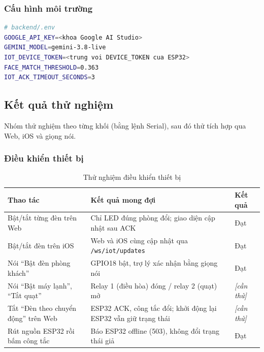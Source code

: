 \documentclass[12pt,a4paper]{extarticle}
\newcommand{\hang}{}  %
\begin{document}
\subsubsection{Cấu hình môi trường}
\begin{lstlisting}[language=bash]
# backend/.env
GOOGLE_API_KEY=<khoa Google AI Studio>
GEMINI_MODEL=gemini-3.8-live
IOT_DEVICE_TOKEN=<trung voi DEVICE_TOKEN cua ESP32>
FACE_MATCH_THRESHOLD=0.363
IOT_ACK_TIMEOUT_SECONDS=3
\end{lstlisting}

\subsection{Kết quả thử nghiệm}
Nhóm thử nghiệm theo từng khối (bằng lệnh Serial), sau đó thử tích hợp qua Web, iOS và giọng nói.

\subsubsection{Điều khiển thiết bị}
\begin{table}[H]
\centering
\begin{tabularx}{\linewidth}{|P{4.4cm}|L|>{\centering\arraybackslash}p{1.8cm}|}
\hline
\hang \textbf{Thao tác} & \textbf{Kết quả mong đợi} & \textbf{Kết quả} \\ \hline
Bật/tắt từng đèn trên Web & Chỉ LED đúng phòng đổi; giao diện cập nhật sau ACK & Đạt \\ \hline
Bật/tắt đèn trên iOS & Web và iOS cùng cập nhật qua \texttt{/ws/iot/updates} & Đạt \\ \hline
Nói ``Bật đèn phòng khách'' & GPIO18 bật, trợ lý xác nhận bằng giọng nói & Đạt \\ \hline
Nói ``Bật máy lạnh'', ``Tắt quạt'' & Relay 1 (điều hòa) đóng / relay 2 (quạt) mở & \textit{[cần thử]} \\ \hline
Tắt ``Đèn theo chuyển động'' trên Web & ESP32 ACK, công tắc đổi; khởi động lại ESP32 vẫn giữ trạng thái & \textit{[cần thử]} \\ \hline
Rút nguồn ESP32 rồi bấm công tắc & Báo ESP32 offline (503), không đổi trạng thái giả & Đạt \\ \hline
\end{tabularx}
\caption{Thử nghiệm điều khiển thiết bị}
\label{tab:tn-dieukhien}
\end{table}
\end{document}
